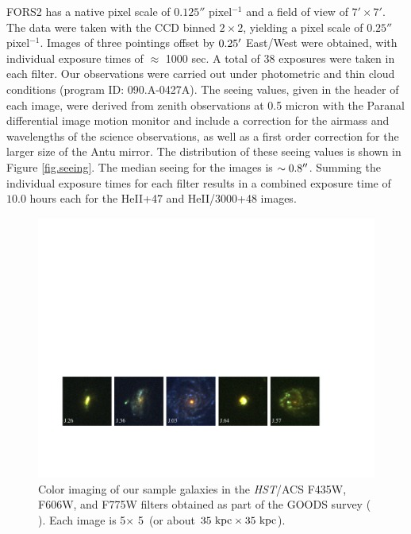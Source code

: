 \documentclass[twocolumn]{aastex62}
\begin{document}
FORS2 has a native pixel scale of $0.125''$ pixel$^{-1}$ and a field of view of $7'\times7'$.  The data were taken with 
the CCD binned $2\times2$, yielding a pixel scale of $0.25''$ pixel$^{-1}$.
Images of three pointings offset by $0.25\mbox{$^\prime$}$ East/West were obtained, with individual exposure times of $\approx$ 1000 sec.  A total of 38  exposures were taken in each filter. 
Our observations were carried out under photometric and thin cloud conditions (program ID: 090.A-0427A). 
The seeing values, given in the header of each image, were derived from zenith observations at 0.5 micron with the Paranal differential image motion monitor \citep[DIMM;][]{Sarazin1990} and include a correction for the airmass and wavelengths of the science observations, as well as a first order correction for the larger size of the Antu mirror. The distribution of these seeing values is shown in Figure \ref{fig.seeing}. The median seeing for the images is $\sim 0.8\mbox{$^{\prime\prime}$}$. Summing the individual exposure times for each filter results in a combined exposure time of $10.0$ hours each for the HeII+47 and HeII/3000+48 images.

\begin{figure}[!ht]
\centering
\includegraphics[scale=.75]{fors2_color_imstamps.pdf}
\caption{Color imaging of our sample galaxies in the \emph{HST}/ACS F435W, F606W, and F775W filters obtained as part of the GOODS survey (\citeauthor{Giavalisco2004} \citeyear{Giavalisco2004}). Each image is 5\arcsec $\times$ 5\arcsec\ (or about $35 \rm \ kpc \times 35 \rm \ kpc$).\label{fig:hstims}}
\end{figure}
\end{document}
